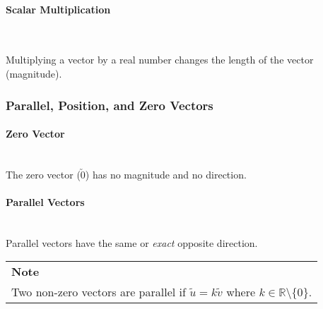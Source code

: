 \documentclass[a4paper]{article}
\newenvironment{Note}{
	\bgroup
	\def\arraystretch{1.5}
	\begin{NiceTabularX}{\textwidth}{X}
		\CodeBefore
		\columncolor{red!15}{1}
		\Body
		\textbf{Note} \\
}{
	\end{NiceTabularX}
	\egroup\mbox{}\\
}{}
\begin{document}
				\paragraph{Scalar Multiplication}\mbox{}\\
					\begin{minipage}{0.5\textwidth}
						Multiplying a vector by a real number changes the length of the vector (magnitude).
					\end{minipage}
					\begin{minipage}{0.5\textwidth}
						\vspace{0pt}
						\begin{flushright}
						\end{flushright}
					\end{minipage}
			\subsubsection{Parallel, Position, and Zero Vectors}
				\paragraph{Zero Vector}\mbox{}\\
					The zero vector ($\utilde{0}$) has no magnitude and no direction.
				\paragraph{Parallel Vectors}\mbox{}\\
					Parallel vectors have the same or \textit{exact} opposite direction. \newline\newline
					\begin{Note}
						Two non-zero vectors are parallel if $\utilde{u}=k\utilde{v}$ where $k\in\mathbb{R}\setminus\{0\}$.
					\end{Note}
\end{document}
